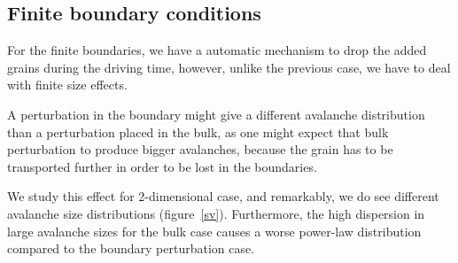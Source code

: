 




\subsection{Finite boundary conditions}

For the finite boundaries, we have a automatic mechanism to drop the added grains during the driving time, however, unlike the previous case, we have to deal with finite size effects. 

A perturbation in the boundary might give a different avalanche distribution than a perturbation placed in the bulk,
as one might expect that bulk perturbation to produce bigger avalanches, 
because the grain has to be transported further in order to be lost in the boundaries.

We study this effect for 2-dimensional case, and remarkably, we do see different avalanche size distributions (figure~\ref{sv}). 
Furthermore, the high dispersion in large avalanche sizes for the bulk case causes a worse power-law distribution compared to the boundary perturbation case.

